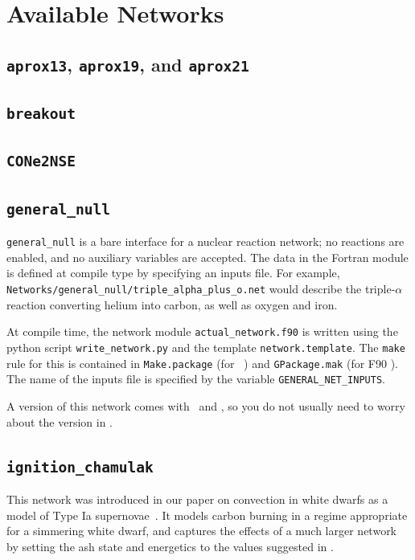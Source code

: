 \section{Available Networks}


\subsection{{\tt aprox13}, {\tt aprox19}, and {\tt aprox21}}

\subsection{{\tt breakout}}

\subsection{{\tt CONe2NSE}}

\subsection{{\tt general\_null}}

{\tt general\_null} is a bare interface for a nuclear reaction
network; no reactions are enabled, and no auxiliary variables are
accepted.  The data in the Fortran module is defined at compile type
by specifying an inputs file.  For example, {\tt
  Networks/general\_null/triple\_alpha\_plus\_o.net} would describe
the triple-$\alpha$ reaction converting helium into carbon, as well as
oxygen and iron.

At compile time, the network module {\tt actual\_network.f90}
is written using the python script {\tt write\_network.py}
and the template {\tt network.template}.  The {\tt make} rule
for this is contained in {\tt Make.package} (for \cpp\ \boxlib) and
{\tt GPackage.mak} (for F90 \boxlib).  The name of the inputs file
is specified by the variable {\tt GENERAL\_NET\_INPUTS}.

A version of this network comes with \maestro\ and \castro, so you do
not usually need to worry about the version in \microphysics.


\subsection{{\tt ignition\_chamulak}}

This network was introduced in our paper on convection in white dwarfs
as a model of Type Ia supernovae~\cite{wdconvect}.  It models
carbon burning in a regime appropriate for a simmering white dwarf,
and captures the effects of a much larger network by setting the ash
state and energetics to the values suggested in \cite{chamulak:2008}.

